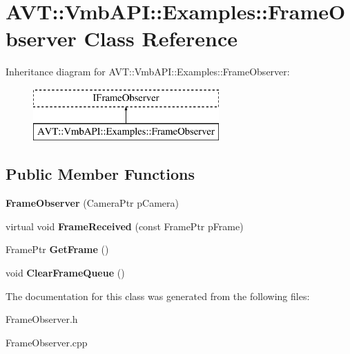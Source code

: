 \hypertarget{class_a_v_t_1_1_vmb_a_p_i_1_1_examples_1_1_frame_observer}{}\section{A\+VT\+:\+:Vmb\+A\+PI\+:\+:Examples\+:\+:Frame\+Observer Class Reference}
\label{class_a_v_t_1_1_vmb_a_p_i_1_1_examples_1_1_frame_observer}
Inheritance diagram for A\+VT\+:\+:Vmb\+A\+PI\+:\+:Examples\+:\+:Frame\+Observer\+:\begin{figure}[H]
\begin{center}
\leavevmode
\includegraphics[height=2.000000cm]{class_a_v_t_1_1_vmb_a_p_i_1_1_examples_1_1_frame_observer}
\end{center}
\end{figure}
\subsection*{Public Member Functions}
\begin{DoxyCompactItemize}
\item 
\mbox{\label{class_a_v_t_1_1_vmb_a_p_i_1_1_examples_1_1_frame_observer_a28b23d2b16c95929ee4463bd0ba8f867}} 
{\bfseries Frame\+Observer} (Camera\+Ptr p\+Camera)
\item 
\mbox{\label{class_a_v_t_1_1_vmb_a_p_i_1_1_examples_1_1_frame_observer_a09bfd28da454e248621496663e8c1e7d}} 
virtual void {\bfseries Frame\+Received} (const Frame\+Ptr p\+Frame)
\item 
\mbox{\label{class_a_v_t_1_1_vmb_a_p_i_1_1_examples_1_1_frame_observer_ae932f5adb14ae6cc88bbc335759b37eb}} 
Frame\+Ptr {\bfseries Get\+Frame} ()
\item 
\mbox{\label{class_a_v_t_1_1_vmb_a_p_i_1_1_examples_1_1_frame_observer_a3b6e1c1643170b09de173fe7506d409d}} 
void {\bfseries Clear\+Frame\+Queue} ()
\end{DoxyCompactItemize}


The documentation for this class was generated from the following files\+:\begin{DoxyCompactItemize}
\item 
Frame\+Observer.\+h\item 
Frame\+Observer.\+cpp\end{DoxyCompactItemize}
